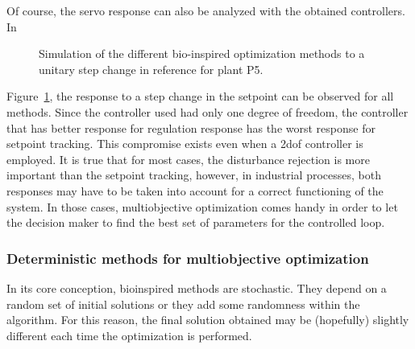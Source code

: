 Of course, the servo response can also be analyzed with the obtained controllers. In %
%
\begin{figure}[tb]%
	\centering
	\caption{Simulation of the different bio-inspired optimization methods to a unitary step change in reference for plant P5.}%
	\label{fig:Reference}%
\end{figure}
%
Figure~\ref{fig:Reference}, the response to a step change in the setpoint can be observed for all methods. Since the controller used had only one degree of freedom, the controller that has better response for regulation response has the worst response for setpoint tracking. This compromise exists even when a \gls{2dof} controller is employed. It is true that for most cases, the disturbance rejection is more important than the setpoint tracking, however, in industrial processes, both responses may have to be taken into account for a correct functioning of the system. In those cases, multiobjective optimization comes handy in order to let the decision maker to find the best set of parameters for the controlled loop.

\subsubsection{Deterministic methods for multiobjective optimization}

In its core conception, bioinspired methods are stochastic. They depend on a random set of initial solutions or they add some randomness within the algorithm. For this reason, the final solution obtained may be (hopefully) slightly different each time the optimization is performed.

